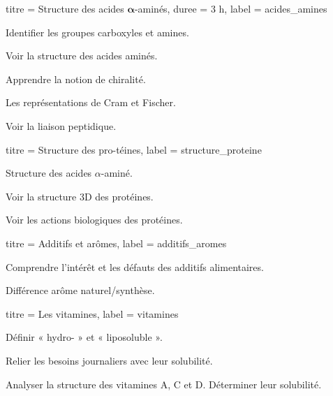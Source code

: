 \begin{multicols}{2}
  \begin{activite}{titre = Structure des acides $\mathbf{\alpha}$-aminés, duree = 3 h, label = acides_amines}
    \begin{prerequis}
      \item Identifier les groupes carboxyles et amines.
    \end{prerequis}
    \begin{objectifs}  
      \item Voir la structure des acides aminés.
      \item Apprendre la notion de chiralité.
      \item Les représentations de Cram et Fischer.
      \item Voir la liaison peptidique.
    \end{objectifs}
  \end{activite}
  \hfill

  \begin{activite}{titre = Structure des pro-téines, label = structure_proteine}
    \begin{prerequis}
      \item Structure des acides $\alpha$-aminé.
    \end{prerequis}
    \begin{objectifs}
      \item Voir la structure 3D des protéines.
      \item Voir les actions biologiques des protéines.
    \end{objectifs}
  \end{activite}
  \smallskip

  \setcounter{activiteNum}{4}
  \begin{activite}{titre = Additifs et arômes, label = additifs_aromes}
    \begin{objectifs}
      \item Comprendre l'intérêt et les défauts des additifs alimentaires.
      \item Différence arôme naturel/synthèse.
    \end{objectifs}
  \end{activite}

  \setcounter{activiteNum}{2}
  \begin{activite}{titre = Les vitamines, label = vitamines}
    \begin{objectifs}
      \item Définir « hydro- » et « liposoluble ».
      \item Relier les besoins journaliers avec leur solubilité.
      \item Analyser la structure des vitamines A, C et D. Déterminer leur solubilité.
    \end{objectifs}
  \end{activite}
  \hfill
  

\end{multicols}
